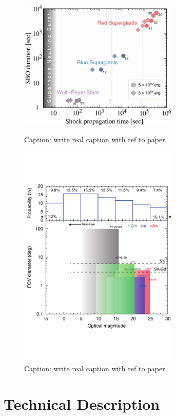 \documentclass[11pt, letterpaper]{article}
\begin{document}
\begin{figure}
  \begin{center}
    \begin{minipage}[b]{3.1in}
      \includegraphics[width=3.0in]{apj487119f2_hr}
      \caption{Caption: write real caption with ref to paper}
      \label{fig:delay-times}
    \end{minipage}
    \hspace{0.2in}
    \begin{minipage}[b]{3.1in}
      \includegraphics[width=3.0in]{fig9}
      \caption{Caption: write real caption with ref to paper}
      \label{fig:multimessenger-comparison}
    \end{minipage}
  \end{center}
\end{figure}

\clearpage

\newpage
\section{Technical Description}
\end{document}
